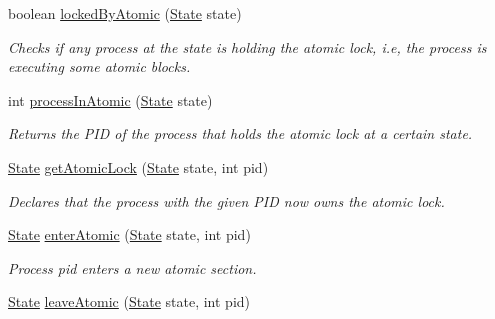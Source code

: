 \begin{DoxyCompactItemize}
boolean \hyperlink{interfaceedu_1_1udel_1_1cis_1_1vsl_1_1civl_1_1state_1_1IF_1_1StateFactory_a8960b6b6ec0ad03227bf46ee17b19ed1}{locked\+By\+Atomic} (\hyperlink{interfaceedu_1_1udel_1_1cis_1_1vsl_1_1civl_1_1state_1_1IF_1_1State}{State} state)
\begin{DoxyCompactList}\small\item\em Checks if any process at the state is holding the atomic lock, i.\+e, the process is executing some atomic blocks. \end{DoxyCompactList}\item 
int \hyperlink{interfaceedu_1_1udel_1_1cis_1_1vsl_1_1civl_1_1state_1_1IF_1_1StateFactory_abd00efcbcd99ef258a98712c1a5519fd}{process\+In\+Atomic} (\hyperlink{interfaceedu_1_1udel_1_1cis_1_1vsl_1_1civl_1_1state_1_1IF_1_1State}{State} state)
\begin{DoxyCompactList}\small\item\em Returns the P\+I\+D of the process that holds the atomic lock at a certain state. \end{DoxyCompactList}\item 
\hyperlink{interfaceedu_1_1udel_1_1cis_1_1vsl_1_1civl_1_1state_1_1IF_1_1State}{State} \hyperlink{interfaceedu_1_1udel_1_1cis_1_1vsl_1_1civl_1_1state_1_1IF_1_1StateFactory_aeba2dd3ec097f8086d633109f66419df}{get\+Atomic\+Lock} (\hyperlink{interfaceedu_1_1udel_1_1cis_1_1vsl_1_1civl_1_1state_1_1IF_1_1State}{State} state, int pid)
\begin{DoxyCompactList}\small\item\em Declares that the process with the given P\+I\+D now owns the atomic lock. \end{DoxyCompactList}\item 
\hyperlink{interfaceedu_1_1udel_1_1cis_1_1vsl_1_1civl_1_1state_1_1IF_1_1State}{State} \hyperlink{interfaceedu_1_1udel_1_1cis_1_1vsl_1_1civl_1_1state_1_1IF_1_1StateFactory_a20c86533f0d632ee5258f90c464d596e}{enter\+Atomic} (\hyperlink{interfaceedu_1_1udel_1_1cis_1_1vsl_1_1civl_1_1state_1_1IF_1_1State}{State} state, int pid)
\begin{DoxyCompactList}\small\item\em Process pid enters a new atomic section. \end{DoxyCompactList}\item 
\hyperlink{interfaceedu_1_1udel_1_1cis_1_1vsl_1_1civl_1_1state_1_1IF_1_1State}{State} \hyperlink{interfaceedu_1_1udel_1_1cis_1_1vsl_1_1civl_1_1state_1_1IF_1_1StateFactory_ace7452c8c5a59d8862e3fc189577cf8b}{leave\+Atomic} (\hyperlink{interfaceedu_1_1udel_1_1cis_1_1vsl_1_1civl_1_1state_1_1IF_1_1State}{State} state, int pid)

\end{DoxyCompactItemize}
